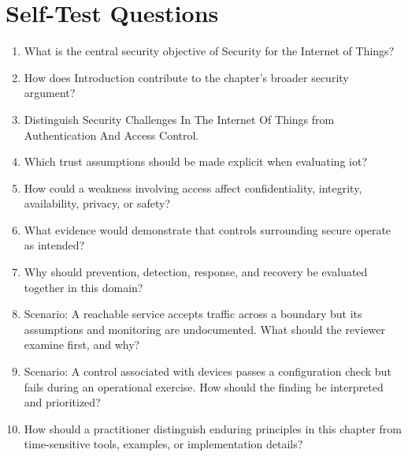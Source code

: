\documentclass[11pt]{article}
\begin{document}
\section*{Self-Test Questions}
\begin{enumerate}
\item What is the central security objective of Security for the Internet of Things?
\item How does Introduction contribute to the chapter's broader security argument?
\item Distinguish Security Challenges In The Internet Of Things from Authentication And Access Control.
\item Which trust assumptions should be made explicit when evaluating iot?
\item How could a weakness involving access affect confidentiality, integrity, availability, privacy, or safety?
\item What evidence would demonstrate that controls surrounding secure operate as intended?
\item Why should prevention, detection, response, and recovery be evaluated together in this domain?
\item Scenario: A reachable service accepts traffic across a boundary but its assumptions and monitoring are undocumented. What should the reviewer examine first, and why?
\item Scenario: A control associated with devices passes a configuration check but fails during an operational exercise. How should the finding be interpreted and prioritized?
\item How should a practitioner distinguish enduring principles in this chapter from time-sensitive tools, examples, or implementation details?
\end{enumerate}
\end{document}
